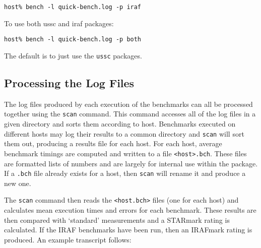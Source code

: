 {\tt host\% bench -l quick-bench.log -p iraf}

To use both ussc and iraf packages:

{\tt host\% bench -l quick-bench.log -p both}

The default is to just use the {\tt ussc} packages.

\subsection{Processing the Log Files}

The log files produced by each execution of the benchmarks can all be
processed together using the {\tt scan} command. This command accesses
all of the log files in a given directory and sorts them according to
host. Benchmarks executed on different hosts may log their results to a
common directory and {\tt scan} will sort them out, producing a results
file for each host. For each host, average benchmark timings are
computed and written to a file {\tt <host>.bch}.  These files are
formatted lists of numbers and are largely for internal use within the
package. If a {\tt .bch} file already exists for a host, then {\tt scan}
will rename it and produce a new one.

The {\tt scan} command then reads the {\tt <host.bch>} files (one for
each host) and calculates mean execution times and errors for each
benchmark. These results are then compared with `standard' measurements
and a STARmark rating is calculated. If the IRAF benchmarks have
been run, then an IRAFmark rating is produced. An example transcript
follows:


